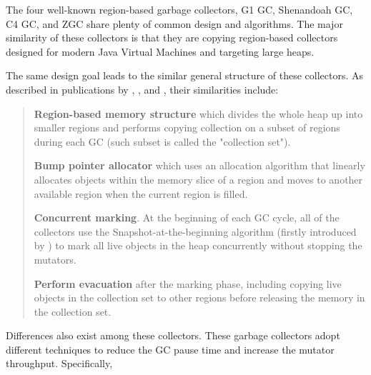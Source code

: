 The four well-known region-based garbage collectors, G1 GC, Shenandoah GC, C4 GC, and
ZGC share plenty of common design and algorithms. The major similarity of these collectors
is that they are copying region-based collectors designed for modern Java Virtual
Machines and targeting large heaps.

The same design goal leads to the similar general structure of these collectors.
As described in publications by \cite{detlefs2004garbage}, \cite{flood2016shenandoah},
\cite{tene2011c4} and \cite{liden_karlsson_2018}, their similarities include:

\begin{quote}
  \textbf{Region-based memory structure}
    which divides the whole heap up into smaller regions and performs copying collection
    on a subset of regions during each GC (such subset is called the "collection set").

  \textbf{Bump pointer allocator}
    which uses an allocation algorithm that linearly allocates objects within the memory
    slice of a region and moves to another available region when the current region is filled.

  \textbf{Concurrent marking}.
    At the beginning of each GC cycle, all of the collectors use the Snapshot-at-the-beginning algorithm
    (firstly introduced by \cite{yuasa1990real}) to mark all live objects in the heap
    concurrently without stopping the mutators.

  \textbf{Perform evacuation}
    after the marking phase, including copying live objects in the collection set to other
    regions before releasing the memory in the collection set.
\end{quote}

Differences also exist among these collectors. These garbage collectors adopt
different techniques to reduce the GC pause time and increase the mutator throughput.
Specifically,

